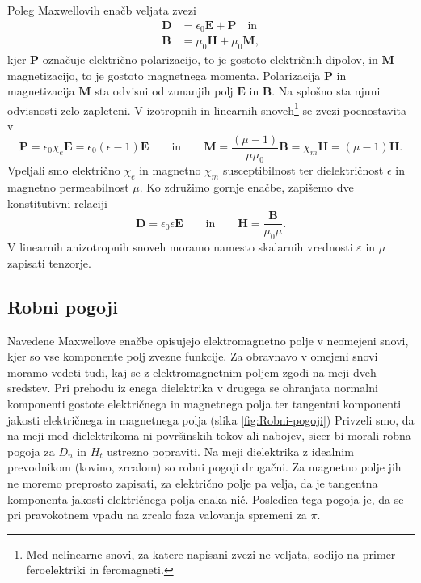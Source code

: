 Poleg Maxwellovih enačb veljata zvezi
\begin{align}
\mathbf{D} & =\epsilon_{0}\mathbf{E}+\mathbf{P} \quad \mathrm{in}\\
\mathbf{B} & =\mu_{0}\mathbf{H}+\mu_{0}\mathbf{M},
\end{align}
kjer $\mathbf{P}$ označuje električno
polarizacijo, to je gostoto električnih dipolov, in  $\mathbf{M}$
magnetizacijo, to je gostoto magnetnega momenta.
Polarizacija $\mathbf{P}$ in magnetizacija $\mathbf{M}$ sta odvisni od zunanjih polj $\mathbf{E}$
in $\mathbf{B}$. Na splošno sta njuni odvisnosti zelo zapleteni.
V izotropnih in linearnih snoveh\footnote{Med nelinearne snovi, za katere
napisani zvezi ne veljata, sodijo na primer feroelektriki in feromagneti.}
 se zvezi poenostavita v 
\begin{equation}
\mathbf{P}=\epsilon_{0}\chi_e\mathbf{E} = \epsilon_{0}(\epsilon-1)\mathbf{E} \qquad \textrm{in} 
\qquad
\mathbf{M}=\frac{(\mu-1)}{\mu\mu_0}\mathbf{B} = \chi_m \mathbf{H} = (\mu-1)\mathbf{H}
\label{eq:PM}.
\end{equation}
Vpeljali smo  električno $\chi_e$ in 
magnetno $\chi_m$ susceptibilnost ter
dielektričnost $\epsilon$ in
magnetno permeabilnost $\mu$. Ko združimo gornje
enačbe, zapišemo dve konstitutivni
relaciji
\begin{equation}
\mathbf{D}  =\epsilon_{0}\epsilon\mathbf{E}\qquad \textrm{in} 
\qquad
\mathbf{H}  =\frac{\mathbf{B}}{\mu_{0}\mu}.
\end{equation}
V linearnih anizotropnih snoveh moramo namesto skalarnih vrednosti $\varepsilon$
in $\mu$ zapisati tenzorje. 

\subsection*{Robni pogoji}
Navedene Maxwellove enačbe opisujejo elektromagnetno polje
v neomejeni snovi, kjer so vse komponente polj zvezne funkcije. Za
obravnavo v omejeni snovi moramo vedeti tudi, kaj se z elektromagnetnim
poljem zgodi na meji dveh sredstev. Pri prehodu
iz enega dielektrika v drugega se ohranjata normalni komponenti gostote
električnega in magnetnega polja ter tangentni komponenti jakosti
električnega in magnetnega polja (slika \ref{fig:Robni-pogoji}) 
Privzeli smo, da na meji med dielektrikoma ni površinskih
tokov ali nabojev, sicer bi morali robna pogoja za $D_n$ in $H_t$
ustrezno popraviti. Na meji dielektrika z idealnim prevodnikom (kovino,
zrcalom) so robni pogoji drugačni. Za magnetno polje jih ne moremo
preprosto zapisati, za električno polje pa velja, da je tangentna
komponenta jakosti električnega polja enaka nič. Posledica tega 
pogoja je, da se pri pravokotnem vpadu na zrcalo faza valovanja
spremeni za $\pi$. 

